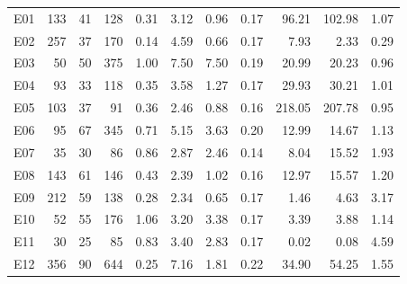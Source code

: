 \documentclass[sigconf,review]{acmart}
\begin{document}
{\begin{table}[]
\begin{tabular}{crrrrrrrrrr}
			E01 & 133 & 41 & 128 & 0.31 & 3.12 & 0.96 & 0.17 & 96.21 & 102.98 & 1.07 \\
			E02 & 257 & 37 & 170 & 0.14 & 4.59 & 0.66 & 0.17 & 7.93 & 2.33 & 0.29 \\
			E03 & 50 & 50 & 375 & 1.00 & 7.50 & 7.50 & 0.19 & 20.99 & 20.23 & 0.96 \\
			E04 & 93 & 33 & 118 & 0.35 & 3.58 & 1.27 & 0.17 & 29.93 & 30.21 & 1.01 \\
			E05 & 103 & 37 & 91 & 0.36 & 2.46 & 0.88 & 0.16 & 218.05 & 207.78 & 0.95 \\
			E06 & 95 & 67 & 345 & 0.71 & 5.15 & 3.63 & 0.20 & 12.99 & 14.67 & 1.13 \\
			E07 & 35 & 30 & 86 & 0.86 & 2.87 & 2.46 & 0.14 & 8.04 & 15.52 & 1.93 \\
			E08 & 143 & 61 & 146 & 0.43 & 2.39 & 1.02 & 0.16 & 12.97 & 15.57 & 1.20 \\
			E09 & 212 & 59 & 138 & 0.28 & 2.34 & 0.65 & 0.17 & 1.46 & 4.63 & 3.17 \\
			E10 & 52 & 55 & 176 & 1.06 & 3.20 & 3.38 & 0.17 & 3.39 & 3.88 & 1.14 \\
			E11 & 30 & 25 & 85 & 0.83 & 3.40 & 2.83 & 0.17 & 0.02 & 0.08 & 4.59 \\
			E12 & 356 & 90 & 644 & 0.25 & 7.16 & 1.81 & 0.22 & 34.90 & 54.25 & 1.55 \\
			\hline
		\end{tabular}
	\end{table}
	
}
\end{document}
